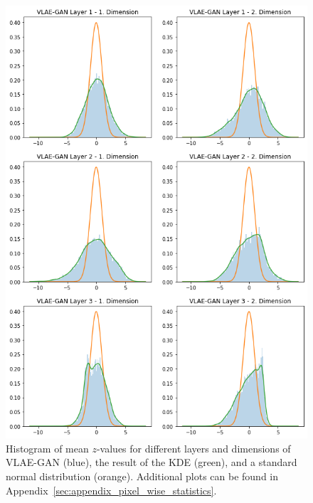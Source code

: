 \begin{figure}
    \centering
    \includegraphics[width=.8\textwidth]{images/generated_vs_true/vlae_gan_kde.png}
    \caption[\ac{VLAE}-GAN - Latent Space Distribution]{Histogram of mean $z$-values for different layers and dimensions of \ac{VLAE}-\ac{GAN} (blue), the result of the \ac{KDE} (green), and a standard normal distribution (orange). Additional plots can be found in Appendix~\ref{sec:appendix_pixel_wise_statistics}.}
    \label{fig:vlae_gan_kde}
\end{figure}


